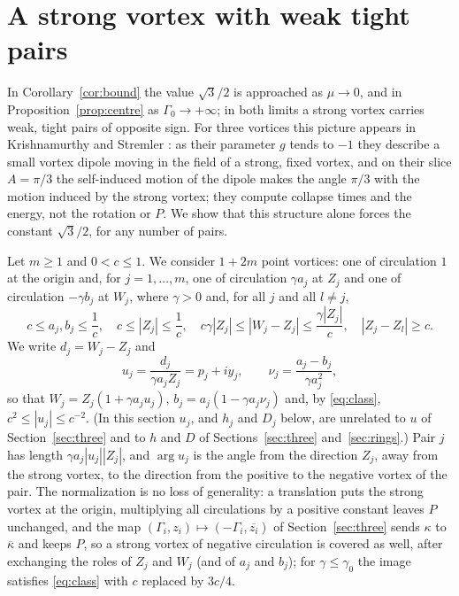 \documentclass[11pt]{article}
\theoremstyle{definition}
\begin{document}
\section{A strong vortex with weak tight pairs}\label{sec:pairs}

In Corollary~\ref{cor:bound} the value $\sqrt{3}/2$ is approached as $\mu \to 0$, and in Proposition~\ref{prop:centre} as $\Gamma_0 \to +\infty$; in both limits a strong vortex carries weak, tight pairs of opposite sign. For three vortices this picture appears in Krishnamurthy and Stremler \cite[Sect.~3.6, Fig.~9]{ks2018}: as their parameter $g$ tends to $-1$ they describe a small vortex dipole moving in the field of a strong, fixed vortex, and on their slice $A = \pi/3$ the self-induced motion of the dipole makes the angle $\pi/3$ with the motion induced by the strong vortex; they compute collapse times and the energy, not the rotation or $P$. We show that this structure alone forces the constant $\sqrt{3}/2$, for any number of pairs.

Let $m \ge 1$ and $0 < c \le 1$. We consider $1 + 2m$ point vortices: one of circulation $1$ at the origin and, for $j = 1, \dots, m$, one of circulation $\gamma a_j$ at $Z_j$ and one of circulation $-\gamma b_j$ at $W_j$, where $\gamma > 0$ and, for all $j$ and all $l \ne j$,
\begin{equation}\label{eq:class}
  c \le a_j, b_j \le \frac{1}{c}, \quad c \le |Z_j| \le \frac{1}{c}, \quad c\gamma|Z_j| \le |W_j - Z_j| \le \frac{\gamma|Z_j|}{c}, \quad |Z_j - Z_l| \ge c.
\end{equation}
We write $d_j = W_j - Z_j$ and
\[
  u_j = \frac{d_j}{\gamma a_j Z_j} = p_j + iy_j, \qquad \nu_j = \frac{a_j - b_j}{\gamma a_j^2},
\]
so that $W_j = Z_j(1 + \gamma a_j u_j)$, $b_j = a_j(1 - \gamma a_j\nu_j)$ and, by \eqref{eq:class}, $c^2 \le |u_j| \le c^{-2}$. (In this section $u_j$, and $h_j$ and $D_j$ below, are unrelated to $u$ of Section~\ref{sec:three} and to $h$ and $D$ of Sections~\ref{sec:three} and~\ref{sec:rings}.) Pair $j$ has length $\gamma a_j|u_j||Z_j|$, and $\arg u_j$ is the angle from the direction $Z_j$, away from the strong vortex, to the direction from the positive to the negative vortex of the pair. The normalization is no loss of generality: a translation puts the strong vortex at the origin, multiplying all circulations by a positive constant leaves $P$ unchanged, and the map $(\Gamma_i, z_i) \mapsto (-\Gamma_i, \overline{z_i})$ of Section~\ref{sec:three} sends $\kappa$ to $\overline{\kappa}$ and keeps $P$, so a strong vortex of negative circulation is covered as well, after exchanging the roles of $Z_j$ and $W_j$ (and of $a_j$ and $b_j$); for $\gamma \le \gamma_0$ the image satisfies \eqref{eq:class} with $c$ replaced by $3c/4$.
\end{document}
